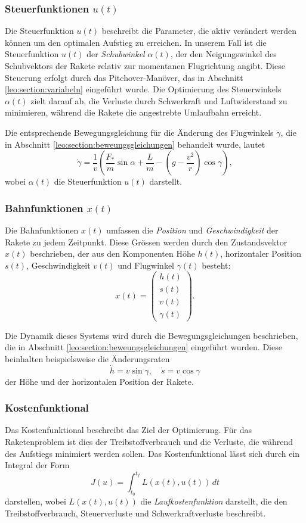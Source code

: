 \subsubsection{Steuerfunktionen \( u(t) \)}

Die Steuerfunktion \( u(t) \) beschreibt die Parameter, die aktiv verändert werden können um den optimalen Aufstieg zu erreichen. 
In unserem Fall ist die Steuerfunktion \( u(t) \) der \textit{Schubwinkel} \( \alpha(t) \), der den Neigungswinkel des Schubvektors der Rakete relativ zur momentanen Flugrichtung angibt. 
Diese Steuerung erfolgt durch das Pitchover-Manöver, das in Abschnitt \ref{leo:section:variabeln} eingeführt wurde. 
Die Optimierung des Steuerwinkels \( \alpha(t) \) zielt darauf ab, die Verluste durch Schwerkraft und Luftwiderstand zu minimieren, während die Rakete die angestrebte Umlaufbahn erreicht.

Die entsprechende Bewegungsgleichung für die Änderung des Flugwinkels \( \dot{\gamma} \), die in Abschnitt \ref{leo:section:beweungsgleichungen} behandelt wurde, lautet
\[
\dot{\gamma} = \frac{1}{v} \left( \frac{F_*}{m} \sin \alpha + \frac{L}{m} - \left( g - \frac{v^2}{r} \right) \cos \gamma \right),
\]
wobei \( \alpha(t) \) die Steuerfunktion \( u(t) \) darstellt.

\subsubsection{Bahnfunktionen \( x(t) \)}
Die Bahnfunktionen \( x(t) \) umfassen die \textit{Position} und \textit{Geschwindigkeit} der Rakete zu jedem Zeitpunkt. 
Diese Grössen werden durch den Zustandsvektor \( x(t) \) beschrieben, der aus den Komponenten Höhe \( h(t) \), horizontaler Position \( s(t) \), Geschwindigkeit \( v(t) \) und Flugwinkel \( \gamma(t) \) besteht:
\[
x(t) = \begin{pmatrix} h(t) \\ s(t) \\ v(t) \\ \gamma(t) \end{pmatrix}.
\]

Die Dynamik dieses Systems wird durch die Bewegungsgleichungen beschrieben, die in Abschnitt \ref{leo:section:beweungsgleichungen} eingeführt wurden. 
Diese beinhalten beispielsweise die Änderungsraten
\[
\dot{h} = v \sin \gamma, \quad \dot{s} = v \cos \gamma
\]
der Höhe und der horizontalen Position der Rakete.

\subsubsection{Kostenfunktional}
Das Kostenfunktional beschreibt das Ziel der Optimierung. Für das Raketenproblem ist dies der Treibstoffverbrauch und die Verluste, die während des Aufstiegs minimiert werden sollen. 
Das Kostenfunktional lässt sich durch ein Integral der Form
\[
J(u) = \int_{t_0}^{t_f} L(x(t), u(t)) \, dt
\]
darstellen, wobei \( L(x(t), u(t)) \) die \textit{Laufkostenfunktion} darstellt, die den Treibstoffverbrauch, Steuerverluste und Schwerkraftverluste beschreibt.

